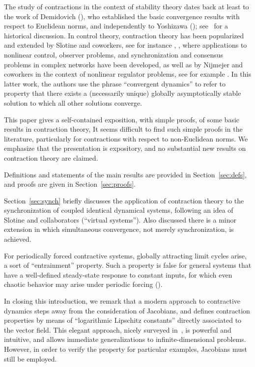 \documentclass{svmult}
\begin{document}
The study of contractions in the context of stability theory dates back at
least to the work of Demidovich (\cite{demidovich}), who established the basic
convergence results with respect to Euclidean norms, and independently to
Yoshizawa (\cite{yoshizawa1,yoshizawa2}); see~\cite{pavlov} for a historical
discussion. 
In control theory, contraction theory has been popularized and extended by 
Slotine and coworkers, see for instance 
\cite{Loh_Slo_00}, \cite{Jou_04_a}, \cite{Wan_Slo_05}
where applications to nonlinear control, observer problems, and synchronization
and consensus problems in complex networks have been developed,
as well as by Nijmejer and coworkers in the context of nonlinear regulator
problems, see for example \cite{pavlov_book}.
In this latter work, the authors use the phrase ``convergent dynamics''
to refer to property that there exists a (necessarily unique) globally
asymptotically stable solution to which all other solutions converge.

This paper gives a self-contained exposition, with simple proofs, of some
basic results in contraction theory, It seems difficult to find such simple
proofs in the literature, particularly for contractions with respect to
non-Euclidean norms.  We emphasize that the presentation is expository, and no
substantial new results on contraction theory are claimed.

Definitions and statements of the main results are provided in
Section~\ref{sec:defs}, and proofs are given in Section~\ref{sec:proofs}.

Section~\ref{sec:synch} briefly discusses the application of contraction
theory to the synchronization of coupled identical dynamical systems,
following an idea of Slotine and collaborators (``virtual systems'').  Also
discussed there is a minor extension in which simultaneous convergence, not
merely synchronization, is achieved.

For periodically forced contractive systems, globally attracting limit cycles
arise, a sort of ``entrainment'' property.
Such a property is false for general systems that have a well-defined steady-state
response to constant inputs, for which even chaotic behavior may arise under
periodic forcing (\cite{arxiv_chaos_2009}).

In closing this introduction, we remark that a modern approach to contractive
dynamics steps away from the consideration of Jacobians, and defines
contraction properties by means of ``logarithmic Lipschitz constants''
directly associated to the vector field.  This elegant approach, nicely
surveyed in~\cite{soderlind}, is powerful and intuitive, and allows immediate
generalizations to infinite-dimensional problems.  However, in order to verify
the property for particular examples, Jacobians must still be employed.
\end{document}
